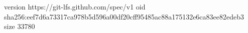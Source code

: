 version https://git-lfs.github.com/spec/v1
oid sha256:eef7d6a73317ca978b5d596a00df20cff95485ac88a175132e6ca83ee82edeb3
size 33780
